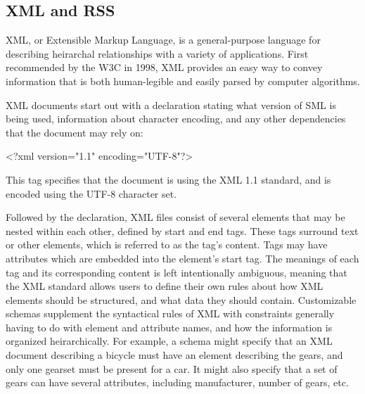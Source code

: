 \documentclass[a4paper,12pt]{report}
\begin{document}
\begin{description}
\section{XML and RSS}



XML, or Extensible Markup Language, is a general-purpose language for describing heirarchal relationships with a variety of applications. 
First recommended by the W3C in 1998, XML provides an easy way to convey information that is both human-legible and easily parsed by computer algorithms. 

XML documents start out with a declaration stating what version of SML is being used, information about character encoding, and any other dependencies that the document may rely on:

<?xml version="1.1" encoding="UTF-8"?>

This tag specifies that the document is using the XML 1.1 standard, and is encoded using the UTF-8 character set.

Followed by the declaration, XML files consist of several elements that may be nested within each other, defined by start and end tags.
These tags surround text or other elements, which is referred to as the tag's content.
Tags may have attributes which are embedded into the element's start tag. 
The meanings of each tag and its corresponding content is left intentionally ambiguous, meaning that the XML standard allows users to define their own rules about how XML elements should be structured, and what data they should contain. 
Customizable schemas supplement the syntactical rules of XML with constraints generally having to do with element and attribute names, and how the information is organized heirarchically. 
For example, a schema might specify that an XML document describing a bicycle must have an element describing the gears, and only one gearset must be present for a car. 
It might also specify that a set of gears can have several attributes, including manufacturer, number of gears, etc. 


\end{description}
\end{document}
